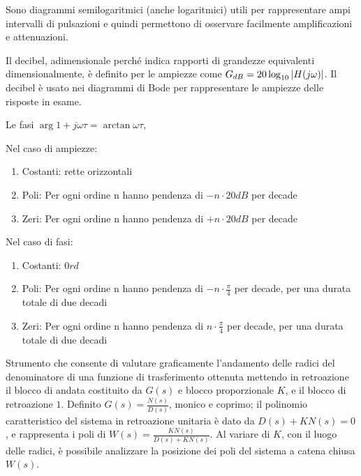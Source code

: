 Sono diagrammi semilogaritmici (anche logaritmici) utili per rappresentare ampi intervalli di pulsazioni e quindi permettono di osservare facilmente amplificazioni e attenuazioni.

Il decibel, adimensionale perché indica rapporti di grandezze equivalenti dimensionalmente, è definito per le ampiezze come $G_{dB} = 20\log_{10}{\left|H(j\omega)\right|}$. Il decibel è usato nei diagrammi di Bode per rappresentare le ampiezze delle risposte in esame.

Le fasi $\arg{1+j\omega \tau}=\arctan{\omega \tau}$, 

Nel caso di ampiezze:
\begin{enumerate}
    \item Costanti: rette orizzontali
    \item Poli: Per ogni ordine n hanno pendenza di $-n\cdot 20dB$ per decade 
    \item Zeri: Per ogni ordine n hanno pendenza di $+n\cdot 20dB$ per decade
\end{enumerate}

Nel caso di fasi:
\begin{enumerate}
    \item Costanti: $0 rd$
    \item Poli: Per ogni ordine n hanno pendenza di $-n\cdot \frac{\pi}{4}$ per decade, per una durata totale di due decadi
    \item Zeri: Per ogni ordine n hanno pendenza di $n\cdot \frac{\pi}{4}$ per decade, per una durata totale di due decadi
\end{enumerate}

Strumento che consente di valutare graficamente l'andamento delle radici del denominatore di una funzione di trasferimento ottenuta mettendo in retroazione il blocco di andata costituito da $G(s)$ e blocco proporzionale $K$, e il blocco di retroazione $1$. 
Definito $G(s)=\frac{N(s)}{D(s)}$, monico e coprimo; il polinomio caratteristico del sistema in retroazione unitaria è dato da $D(s) + K N(s) = 0$, e rappresenta i poli di $W(s)=\frac{K N(s)}{D(s) + K N(s)}$. Al variare di $K$, con il luogo delle radici, è possibile analizzare la posizione dei poli del sistema a catena chiusa $W(s)$.

